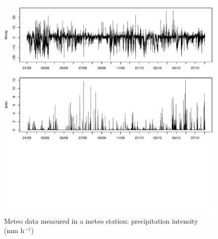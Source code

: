 \begin{figure}[t,b]
\centering
\includegraphics[width =0.9 \textwidth]{./images/pic_domain/meteo_cm3.pdf}
\caption{Meteo data measured in a meteo station: precipitation intensity (mm h$^{-1}$)}
\label{meteo_cm3}
\end{figure}
